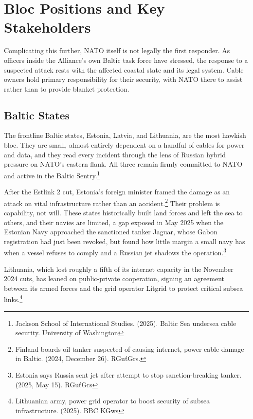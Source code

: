 \section{Bloc Positions and Key Stakeholders}


Complicating this further, NATO itself is not legally the first responder. As officers inside the Alliance's own Baltic task force have stressed, the response to a suspected attack rests with the affected coastal state and its legal system. Cable owners hold primary responsibility for their security, with NATO there to assist rather than to provide blanket protection.

\subsection{Baltic States}

The frontline Baltic states, Estonia, Latvia, and Lithuania, are the most hawkish bloc. They are small, almost entirely dependent on a handful of cables for power and data, and they read every incident through the lens of Russian hybrid pressure on NATO's eastern flank. All three remain firmly committed to NATO and active in the Baltic Sentry.\footnote{Jackson School of International Studies. (2025). Baltic Sea undersea cable security. University of Washington}

After the Estlink 2 cut, Estonia's foreign minister framed the damage as an attack on vital infrastructure rather than an accident.\footnote{Finland boards oil tanker suspected of causing internet, power cable damage in Baltic. (2024, December 26). RGuťGrs.} Their problem is capability, not will. These states historically built land forces and left the sea to others, and their navies are limited, a gap exposed in May 2025 when the Estonian Navy approached the sanctioned tanker Jaguar, whose Gabon registration had just been revoked, but found how little margin a small navy has when a vessel refuses to comply and a Russian jet shadows the operation.\footnote{Estonia says Russia sent jet after attempt to stop sanction-breaking tanker. (2025, May 15). RGuťGrs}

Lithuania, which lost roughly a fifth of its internet capacity in the November 2024 cuts, has leaned on public-private cooperation, signing an agreement between its armed forces and the grid operator Litgrid to protect critical subsea links.\footnote{Lithuanian army, power grid operator to boost security of subsea infrastructure. (2025). BBC KGws}

